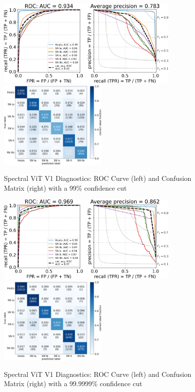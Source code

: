 \begin{figure}[t]
    \centering
    \includegraphics[height=4.3cm]{figures/v1_real/vit_model_V1_original_redoroc99_e31.png}
    \quad
    \includegraphics[height=4.3cm]{figures/v1_real/vit_model_V1_original_redocm99_e31.png}
    \caption{Spectral ViT V1 Diagnostics: ROC Curve (left) and Confusion Matrix (right) with a 99\% confidence
    cut \label{fig:v1_99_qual}}
\end{figure}


\begin{figure}[t]
    \centering
    \includegraphics[height=4.3cm]{figures/v1_real/vit_model_V1_original_redoroc999999_e31.png}
    \quad
    \includegraphics[height=4.3cm]{figures/v1_real/vit_model_V1_original_redocm999999_e31.png}
    \caption{Spectral ViT V1 Diagnostics: ROC Curve (left) and Confusion Matrix (right) with a 99.9999\% confidence
    cut \label{fig:v1_999999_qual}}
\end{figure}






